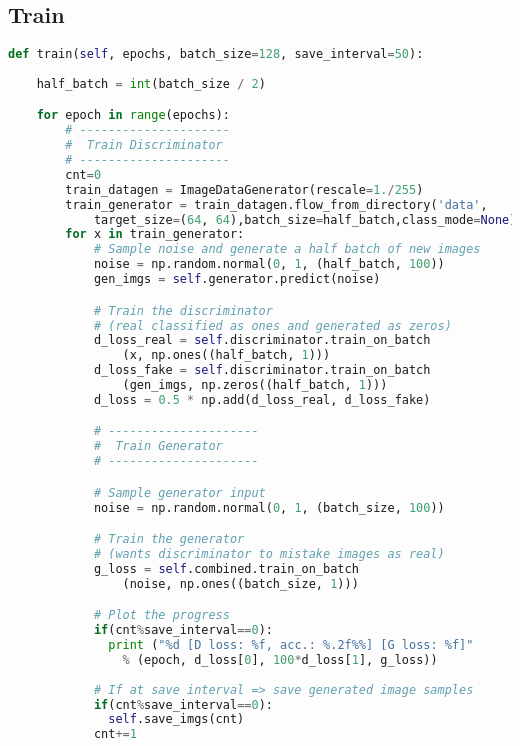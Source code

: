 \par\bigskip

\subsection{Train} %
\label{subsec:train}
\begin{lstlisting}[basicstyle=\scriptsize,language=Python]
def train(self, epochs, batch_size=128, save_interval=50):
    
    half_batch = int(batch_size / 2)

    for epoch in range(epochs):
        # ---------------------
        #  Train Discriminator
        # ---------------------
        cnt=0
        train_datagen = ImageDataGenerator(rescale=1./255)
        train_generator = train_datagen.flow_from_directory('data',
            target_size=(64, 64),batch_size=half_batch,class_mode=None)
        for x in train_generator:
            # Sample noise and generate a half batch of new images
            noise = np.random.normal(0, 1, (half_batch, 100))
            gen_imgs = self.generator.predict(noise)

            # Train the discriminator 
            # (real classified as ones and generated as zeros)
            d_loss_real = self.discriminator.train_on_batch
                (x, np.ones((half_batch, 1)))
            d_loss_fake = self.discriminator.train_on_batch
                (gen_imgs, np.zeros((half_batch, 1)))
            d_loss = 0.5 * np.add(d_loss_real, d_loss_fake)

            # ---------------------
            #  Train Generator
            # ---------------------

            # Sample generator input
            noise = np.random.normal(0, 1, (batch_size, 100))

            # Train the generator 
            # (wants discriminator to mistake images as real)
            g_loss = self.combined.train_on_batch
                (noise, np.ones((batch_size, 1)))

            # Plot the progress
            if(cnt%save_interval==0):
              print ("%d [D loss: %f, acc.: %.2f%%] [G loss: %f]" 
                % (epoch, d_loss[0], 100*d_loss[1], g_loss))
            
            # If at save interval => save generated image samples
            if(cnt%save_interval==0):
              self.save_imgs(cnt)
            cnt+=1
\end{lstlisting}
\par\bigskip

